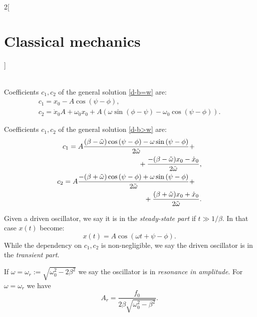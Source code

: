 \documentclass[../../../main.tex]{subfiles}
\begin{document}
\begin{multicols}{2}[\section{Classical mechanics}]
\begin{prop}
\begin{gather*}
        \end{gather*}
    \end{prop}
    \begin{prop}
        Coefficients $c_1,c_2$ of the general solution \eqref{d-b=w} are:
        \begin{gather*}
            c_1=x_0-A\cos\left(\psi-\phi\right),\\
            c_2=\dot{x}_0A+\omega_0x_0+A\left(\omega\sin\left(\phi-\psi\right)-\omega_0\cos\left(\psi-\phi\right)\right).
        \end{gather*}
    \end{prop}
    \begin{prop}
        Coefficients $c_1,c_2$ of the general solution \eqref{d-b>w} are:
        \begin{equation*}
            \begin{split}
                \begin{multlined}[t]
                    c_1=A\frac{(\beta-\Tilde{\omega})\cos\left(\psi-\phi\right)-\omega\sin\left(\psi-\phi\right)}{2\Tilde{\omega}}+\\+\frac{-(\beta-\Tilde{\omega})x_0-\dot{x}_0}{2\Tilde{\omega}},
                \end{multlined}\\
                \begin{multlined}[t]
                    c_2=A\frac{-(\beta+\Tilde{\omega})\cos\left(\psi-\phi\right)+\omega\sin\left(\psi-\phi\right)}{2\Tilde{\omega}}+\\+\frac{(\beta+\Tilde{\omega})x_0+\dot{x}_0}{2\Tilde{\omega}}.
                \end{multlined}
            \end{split}
        \end{equation*}
    \end{prop}
    \begin{definition}
        Given a driven oscillator, we say it is in the \textit{steady-state part} if $t\gg 1/\beta$. In that case $x(t)$ become: $$x(t)=A\cos(\omega t+\psi-\phi).$$ While the dependency on $c_1,c_2$ is non-negligible, we say the driven oscillator is in the \textit{transient part}.
    \end{definition}
    \begin{prop}
        If $\omega=\omega_r:=\sqrt{\omega_0^2-2\beta^2}$ we say the oscillator is in \textit{resonance in amplitude}. For $\omega=\omega_r$ we have $$A_r=\frac{f_0}{2\beta\sqrt{\omega_0^2-\beta^2}}.$$

\end{prop}
\end{multicols}
\end{document}
